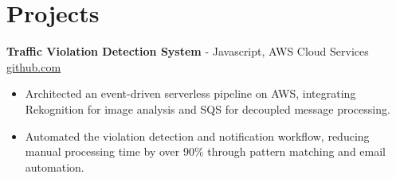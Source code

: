 \documentclass[11pt]{article}       %
\begin{document}

\vspace{-18.5pt}

\section*{Projects}

\textbf{Traffic Violation Detection System}{ - Javascript, AWS Cloud Services} \hfill \href{https://github.com/Monica20030707/AWS_rekonigition-N-read-database}{github.com} \\
\vspace{-9pt}
\begin{itemize}
  \item Architected an event-driven serverless pipeline on AWS, integrating Rekognition for image analysis and SQS for decoupled message processing.
  \item Automated the violation detection and notification workflow, reducing manual processing time by over 90\% through pattern matching and email automation.
\end{itemize}
\end{document}
